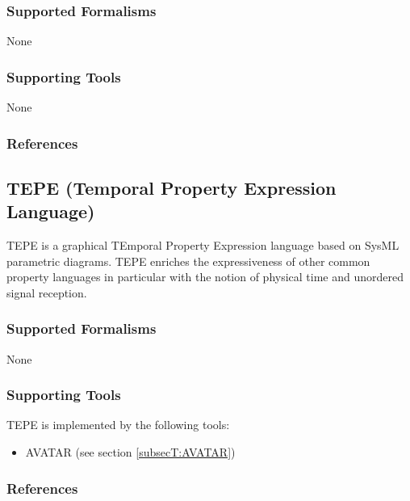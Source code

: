 
\subsubsection{Supported Formalisms}

None


\subsubsection{Supporting Tools}

None


\subsubsection{References}





\subsection{TEPE (Temporal Property Expression Language)}
\label{subsecL:TEPE}

TEPE is a graphical TEmporal Property Expression language based on SysML parametric diagrams. TEPE enriches the expressiveness of other common property languages in particular with the notion of physical time and unordered signal reception.

\subsubsection{Supported Formalisms}

None


\subsubsection{Supporting Tools}

TEPE is implemented by the following tools:
\begin{itemize}
	\item AVATAR (see section \ref{subsecT:AVATAR})
\end{itemize}


\subsubsection{References}





